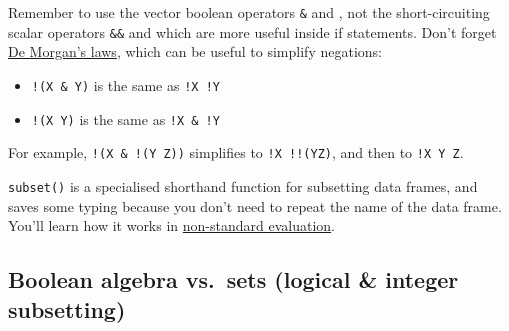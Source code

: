Remember to use the vector boolean operators \texttt{\&} and
\texttt{\textbar{}}, not the short-circuiting scalar operators
\texttt{\&\&} and \texttt{\textbar{}\textbar{}} which are more useful
inside if statements. Don't forget
\href{http://en.wikipedia.org/wiki/De_Morgan's_laws}{De Morgan's laws},
which can be useful to simplify negations:

\begin{itemize}
\itemsep1pt\parskip0pt
\item
  \texttt{!(X \& Y)} is the same as \texttt{!X \textbar{} !Y}
\item
  \texttt{!(X \textbar{} Y)} is the same as \texttt{!X \& !Y}
\end{itemize}

For example, \texttt{!(X \& !(Y \textbar{} Z))} simplifies to
\texttt{!X \textbar{} !!(Y\textbar{}Z)}, and then to
\texttt{!X \textbar{} Y \textbar{} Z}.

\texttt{subset()} is a specialised shorthand function for subsetting
data frames, and saves some typing because you don't need to repeat the
name of the data frame. You'll learn how it works in
\hyperref[nse]{non-standard evaluation}. 

\begin{Shaded}
\begin{Highlighting}[]
\StringTok{ }\NormalTok{)}
\StringTok{ } \NormalTok{&}\StringTok{ }\StringTok{ }\NormalTok{)}
\end{Highlighting}
\end{Shaded}

\subsection{Boolean algebra vs.~sets (logical \& integer subsetting)}

